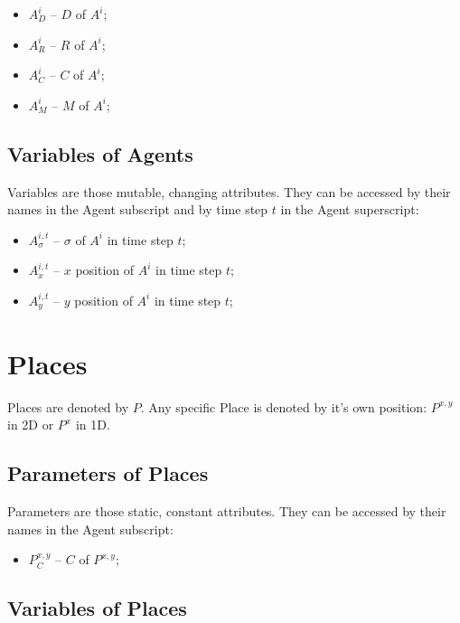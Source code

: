 \documentclass{article}
\begin{document}
\begin{itemize}
    \item $A^{i}_{D}$ -- $D$ of $A^{i}$;
    \item $A^{i}_{R}$ -- $R$ of $A^{i}$;
    \item $A^{i}_{C}$ -- $C$ of $A^{i}$;
    \item $A^{i}_{M}$ -- $M$ of $A^{i}$;
\end{itemize}

\subsection{Variables of Agents}

\par Variables are those mutable, changing attributes. They can be accessed by their names in the Agent subscript and by time step $t$ in the Agent superscript: 

\begin{itemize}
    \item $A^{i,t}_{\sigma}$ -- $\sigma$ of $A^{i}$ in time step $t$;
    \item $A^{i,t}_{x}$ -- $x$ position of $A^{i}$ in time step $t$;
    \item $A^{i,t}_{y}$ -- $y$ position  of $A^{i}$ in time step $t$;
\end{itemize}


\section{Places}

\par Places are denoted by $P$. Any specific Place is denoted by it's own position: $P^{x,y}$ in 2D or $P^{x}$ in 1D.

\subsection{Parameters of Places}

\par Parameters are those static, constant attributes. They can be accessed by their names in the Agent subscript:

\begin{itemize}
    \item $P^{x,y}_{C}$ -- $C$ of $P^{x,y}$;
\end{itemize}

\subsection{Variables of Places}
\end{document}
